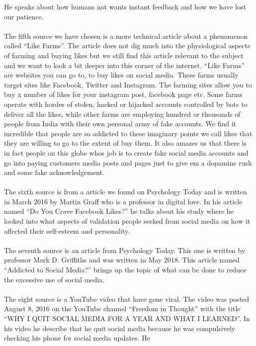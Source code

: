 \documentclass[11pt]{article}
\begin{document}
He speaks about how humans not wants instant feedback and how we have lost our patience.\\
\\
The fifth source \cite{benthamsgaze} we have chosen is a more technical article about
a phenomenon called “Like Farms”. The article does not dig much into the physiological
aspects of farming and buying likes but we still find this article relevant to the
subject and we want to look a bit deeper into this corner of the internet. “Like Farms”
are websites you can go to, to buy likes on social media. These farms usually target
sites like Facebook, Twitter and Instagram. The farming sites allow you to buy x number
of likes for your instagram post, facebook page etc. Some farms operate with hordes of
stolen, hacked or hijacked accounts controlled by bots to deliver all the likes, while
other farms are employing hundred or thousands of people from India with their own
personal army of fake accounts. We find it incredible that people are so addicted to
these imaginary points we call likes that they are willing to go to the extent of buy
them. It also amazes us that there is in fact people on this globe whos job is to create
fake social media accounts and go into paying customers media posts and pages just to
give em a dopamine rush and some fake acknowledgement.\\
\\
The sixth source \cite{psychologytoday1} is from a article we found on Psychology Today
and is written in March 2016 by Martin Graff who is a professor in digital love. In his
article named “Do You Crave Facebook Likes?” he talks about his study where he looked
into what aspects of validation people seeked from social media on how it affected
their self-esteem and personality.\\
\\
The seventh source \cite{psychologytoday2} is an article from Psychology Today. This
one is written by professor Mark D. Griffiths and was written in May 2018. This article
named “Addicted to Social Media?” brings up the topic of what can be done to reduce the
excessive use of social media.\\
\\
The eight source \cite{youtube3} is a YouTube video that have gone viral. The video was
posted August 8, 2016 on the YouTube channel “Freedom in Thought” with the title “WHY I
QUIT SOCIAL MEDIA FOR A YEAR AND WHAT I LEARNED”. In his video he describe that he quit
social media because he was compulsively checking his phone for social media updates. He
\end{document}
